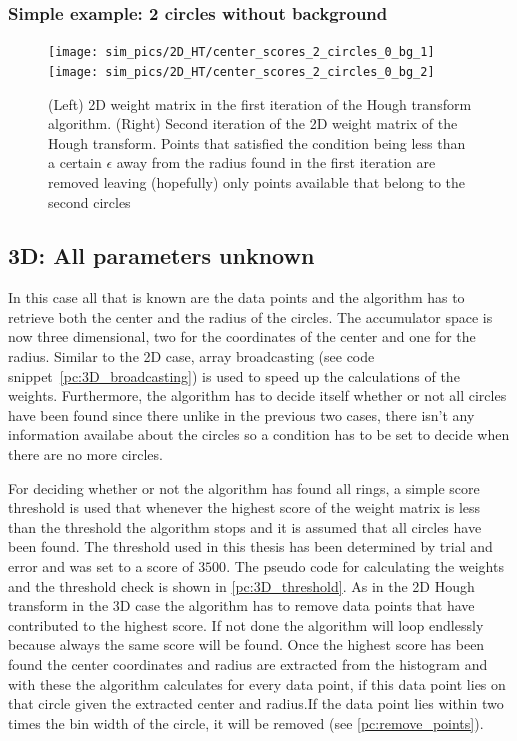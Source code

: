 \documentclass[11pt]{scrreprt}
\begin{document}

\subsubsection{Simple example: 2 circles without background} %
\label{ssub:simple_example_of_2_circles_without_background}
\begin{figure}[hp]
  \centering
  \texttt{[image: sim\_pics/2D\_HT/center\_scores\_2\_circles\_0\_bg\_1]}%
  \texttt{[image: sim\_pics/2D\_HT/center\_scores\_2\_circles\_0\_bg\_2]}

  \caption[2D weight matrix, first iteration]{(Left) 2D weight matrix in the first iteration of the Hough transform algorithm. (Right) Second iteration
  of the 2D weight matrix of the Hough transform. Points that satisfied the condition being less than a certain $\epsilon$ away from the radius found in the first iteration are removed leaving (hopefully) only points available that belong to the second circles}
  \label{fig:2d_weights_01}
\end{figure}

\subsection{3D: All parameters unknown} %
\label{sub:3d_nothing_is_known_find_everything}
In this case all that is known are the data points and the algorithm has to retrieve both the center and the radius of the circles. 
The accumulator space is now three dimensional, two for the coordinates of the center and one for the radius. Similar to the 2D case, 
array broadcasting (see code snippet~\ref{pc:3D_broadcasting}) is used to speed up the calculations of the weights. Furthermore, 
the algorithm has to decide itself whether or not  all circles have been found since there unlike in the previous two cases, there isn't 
any information availabe about the circles so a condition has to be set to decide when there are no more circles.

For deciding whether or not the algorithm has found all rings, a simple score threshold is used that whenever the highest score
of the weight matrix is less than the threshold the algorithm stops and it is assumed that all circles have been found. The threshold
used in this thesis has been determined by trial and error and was set to a score of $3500$. The pseudo code for calculating the weights 
and the threshold check is shown in \ref{pc:3D_threshold}. As in the 2D Hough transform in the 3D case the algorithm has to remove data 
points that have contributed to the highest score. If not done the algorithm will loop endlessly because always the same score will be 
found. Once the highest score has been found the center coordinates and radius are extracted from the histogram and with these the 
algorithm calculates for every data point, if this data point lies on that circle given the extracted center and radius.If the data point 
lies within two times the bin width of the circle, it will be removed (see \ref{pc:remove_points}).
\end{document}
